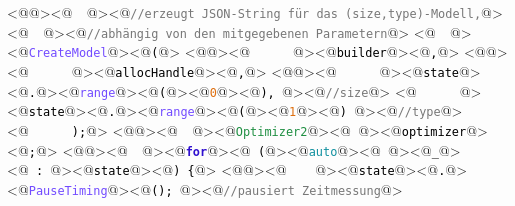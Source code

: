 <@\textcolor[HTML]{000000}{\texttt{}}@><@\textcolor[HTML]{000000}{\texttt{\ \ }}@><@\textcolor[HTML]{777777}{\texttt{//erzeugt\ JSON-String\ für\ das\ (size,type)-Modell,}}@>
<@\textcolor[HTML]{000000}{\texttt{\ \ }}@><@\textcolor[HTML]{777777}{\texttt{//abhängig\ von\ den\ mitgegebenen\ Parametern}}@>
<@\textcolor[HTML]{000000}{\texttt{\ \ }}@><@\textcolor[HTML]{724BFF}{\texttt{CreateModel}}@><@\textcolor[HTML]{000000}{\texttt{(}}@>
<@\textcolor[HTML]{000000}{\texttt{}}@><@\textcolor[HTML]{000000}{\texttt{\ \ \ \ \ \ }}@><@\textcolor[HTML]{000000}{\texttt{builder}}@><@\textcolor[HTML]{000000}{\texttt{,}}@>
<@\textcolor[HTML]{000000}{\texttt{}}@><@\textcolor[HTML]{000000}{\texttt{\ \ \ \ \ \ }}@><@\textcolor[HTML]{000000}{\texttt{allocHandle}}@><@\textcolor[HTML]{000000}{\texttt{,}}@>
<@\textcolor[HTML]{000000}{\texttt{}}@><@\textcolor[HTML]{000000}{\texttt{\ \ \ \ \ \ }}@><@\textcolor[HTML]{000000}{\texttt{state}}@><@\textcolor[HTML]{000000}{\texttt{.}}@><@\textcolor[HTML]{724BFF}{\texttt{range}}@><@\textcolor[HTML]{000000}{\texttt{(}}@><@\textcolor[HTML]{DE6F10}{\texttt{0}}@><@\textcolor[HTML]{000000}{\texttt{),\ }}@><@\textcolor[HTML]{777777}{\texttt{//size}}@>
<@\textcolor[HTML]{000000}{\texttt{\ \ \ \ \ \ }}@><@\textcolor[HTML]{000000}{\texttt{state}}@><@\textcolor[HTML]{000000}{\texttt{.}}@><@\textcolor[HTML]{724BFF}{\texttt{range}}@><@\textcolor[HTML]{000000}{\texttt{(}}@><@\textcolor[HTML]{DE6F10}{\texttt{1}}@><@\textcolor[HTML]{000000}{\texttt{)\ }}@><@\textcolor[HTML]{777777}{\texttt{//type}}@>
<@\textcolor[HTML]{000000}{\texttt{\ \ \ \ \ \ );}}@>
<@\textcolor[HTML]{000000}{\texttt{}}@><@\textcolor[HTML]{000000}{\texttt{\ \ }}@><@\textcolor[HTML]{1F8F42}{\texttt{Optimizer2}}@><@\textcolor[HTML]{000000}{\texttt{\ }}@><@\textcolor[HTML]{000000}{\texttt{optimizer}}@><@\textcolor[HTML]{000000}{\texttt{;}}@>
<@\textcolor[HTML]{000000}{\texttt{}}@><@\textcolor[HTML]{000000}{\texttt{\ \ }}@><@\textcolor[HTML]{3010CF}{\textbf{\texttt{for}}}@><@\textcolor[HTML]{000000}{\texttt{\ (}}@><@\textcolor[HTML]{10909F}{\texttt{auto}}@><@\textcolor[HTML]{000000}{\texttt{\ }}@><@\textcolor[HTML]{000000}{\texttt{\_}}@><@\textcolor[HTML]{000000}{\texttt{\ :\ }}@><@\textcolor[HTML]{000000}{\texttt{state}}@><@\textcolor[HTML]{000000}{\texttt{)\ \{}}@>
<@\textcolor[HTML]{000000}{\texttt{}}@><@\textcolor[HTML]{000000}{\texttt{\ \ \ \ }}@><@\textcolor[HTML]{000000}{\texttt{state}}@><@\textcolor[HTML]{000000}{\texttt{.}}@><@\textcolor[HTML]{724BFF}{\texttt{PauseTiming}}@><@\textcolor[HTML]{000000}{\texttt{();\ }}@><@\textcolor[HTML]{777777}{\texttt{//pausiert\ Zeitmessung}}@>
